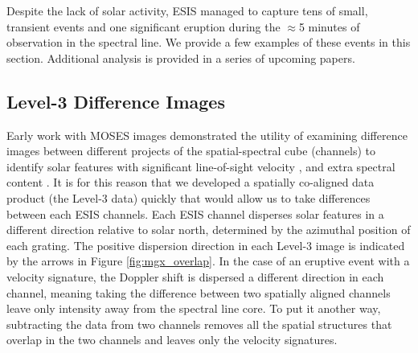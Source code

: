 	    Despite the lack of solar activity, ESIS managed to capture tens of small, transient events and one significant eruption during the $\approx$5 minutes of observation in the \ov spectral line.  We provide a few examples of these events in this section.  Additional analysis is provided in a series of upcoming papers.  
	
    \subsection{Level-3 Difference Images}
    	Early work with MOSES images demonstrated the utility of examining difference images between different projects of the spatial-spectral cube (channels) to identify solar features with significant line-of-sight velocity \citep{Fox2010,FoxPhD,RustPhD,Rust2019}, and extra spectral content \citep{RustPhD, Rust2019,Parker2021}.  
    	It is for this reason that we developed a spatially co-aligned data product (the Level-3 data) quickly that would allow us to take differences between each ESIS channels.
    	Each ESIS channel disperses solar features in a different direction relative to solar north, determined by the azimuthal position of each grating.
    	The positive dispersion direction in each Level-3 image is indicated by the arrows  in Figure \ref{fig:mgx_overlap}.
    	In the case of an eruptive event with a velocity signature, the Doppler shift is dispersed a different direction in each channel, meaning taking the difference between two spatially aligned channels leave only intensity away from the spectral line core.  To put it another way, subtracting the data from two channels removes all the spatial structures that overlap in the two channels and leaves only the velocity signatures.  
    	
